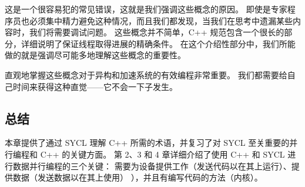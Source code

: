 这是一个很容易犯的常见错误，这就是我们强调这些概念的原因。 
即使是专家程序员也必须集中精力避免这种情况，而且我们都发现，当我们在思考中遗漏某些内容时，我们将需要调试问题。 
这些概念并不简单，C++ 规范包含一个很长的部分，详细说明了保证线程取得进展的精确条件。 
在这个介绍性部分中，我们所能做的就是强调尽可能多地理解这些概念的重要性。

直观地掌握这些概念对于异构和加速系统的有效编程非常重要。 我们都需要给自己时间来获得这种直觉——它不会一下子发生。

\subsection{总结}
本章提供了通过 SYCL 理解 C++ 所需的术语，并复习了对 SYCL 至关重要的并行编程和 C++ 的关键方面。 
第 2、3 和 4 章详细介绍了使用 C++ 和 SYCL 进行数据并行编程的三个关键：
需要为设备提供工作（发送代码以在其上运行）、提供数据（发送数据以在其上使用） ），并且有编写代码的方法（内核）。